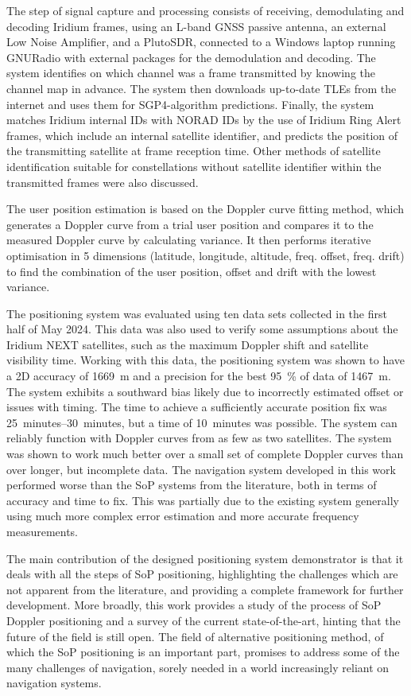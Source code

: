 The step of signal capture and processing consists of receiving, demodulating and decoding Iridium frames, using an L-band GNSS passive antenna, an external Low Noise Amplifier, and a PlutoSDR, connected to a Windows laptop running GNURadio with external packages for the demodulation and decoding. The system identifies on which channel was a frame transmitted by knowing the channel map in advance. The system then downloads up-to-date TLEs from the internet and uses them for SGP4-algorithm predictions. Finally, the system matches Iridium internal IDs with NORAD IDs by the use of Iridium Ring Alert frames, which include an internal satellite identifier, and predicts the position of the transmitting satellite at frame reception time. Other methods of satellite identification suitable for constellations without satellite identifier within the transmitted frames were also discussed.

The user position estimation is based on the Doppler curve fitting method, which generates a Doppler curve from a trial user position and compares it to the measured Doppler curve by calculating variance. It then performs iterative optimisation in 5 dimensions (latitude, longitude, altitude, freq. offset, freq. drift) to find the combination of the user position, offset and drift with the lowest variance.

The positioning system was evaluated using ten data sets collected in the first half of May 2024. This data was also used to verify some assumptions about the Iridium NEXT satellites, such as the maximum Doppler shift and satellite visibility time. Working with this data, the positioning system was shown to have a 2D accuracy of \qty{1669}{m} and a precision for the best \qty{95}{\percent} of data of \qty{1467}{m}. The system exhibits a southward bias likely due to incorrectly estimated offset or issues with timing. The time to achieve a sufficiently accurate position fix was \qtyrange{25}{30}{minutes}, but a time of \qty{10}{minutes} was possible. The system can reliably function with Doppler curves from as few as two satellites. The system was shown to work much better over a small set of complete Doppler curves than over longer, but incomplete data. The navigation system developed in this work performed worse than the SoP systems from the literature, both in terms of accuracy and time to fix. This was partially due to the existing system generally using much more complex error estimation and more accurate frequency measurements.

The main contribution of the designed positioning system demonstrator is that it deals with all the steps of SoP positioning, highlighting the challenges which are not apparent from the literature, and providing a complete framework for further development. More broadly, this work provides a study of the process of SoP Doppler positioning and a survey of the current state-of-the-art, hinting that the future of the field is still open. The field of alternative positioning method, of which the SoP positioning is an important part, promises to address some of the many challenges of navigation, sorely needed in a world increasingly reliant on navigation systems.
